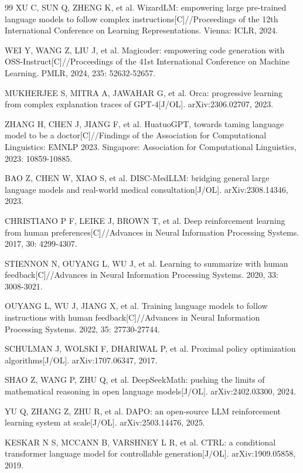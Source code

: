 \documentclass[fontset=fandol,type=master,campus=shenzhen,etitleauto=true]{hithesisbook}
\begin{document}
\begin{thebibliography}{99}
 XU C, SUN Q, ZHENG K, et al. WizardLM: empowering large pre-trained language models to follow complex instructions[C]//Proceedings of the 12th International Conference on Learning Representations. Vienna: ICLR, 2024.

 WEI Y, WANG Z, LIU J, et al. Magicoder: empowering code generation with OSS-Instruct[C]//Proceedings of the 41st International Conference on Machine Learning. PMLR, 2024, 235: 52632-52657.

 MUKHERJEE S, MITRA A, JAWAHAR G, et al. Orca: progressive learning from complex explanation traces of GPT-4[J/OL]. arXiv:2306.02707, 2023.

 ZHANG H, CHEN J, JIANG F, et al. HuatuoGPT, towards taming language model to be a doctor[C]//Findings of the Association for Computational Linguistics: EMNLP 2023. Singapore: Association for Computational Linguistics, 2023: 10859-10885.

 BAO Z, CHEN W, XIAO S, et al. DISC-MedLLM: bridging general large language models and real-world medical consultation[J/OL]. arXiv:2308.14346, 2023.

 CHRISTIANO P F, LEIKE J, BROWN T, et al. Deep reinforcement learning from human preferences[C]//Advances in Neural Information Processing Systems. 2017, 30: 4299-4307.

 STIENNON N, OUYANG L, WU J, et al. Learning to summarize with human feedback[C]//Advances in Neural Information Processing Systems. 2020, 33: 3008-3021.

 OUYANG L, WU J, JIANG X, et al. Training language models to follow instructions with human feedback[C]//Advances in Neural Information Processing Systems. 2022, 35: 27730-27744.

 SCHULMAN J, WOLSKI F, DHARIWAL P, et al. Proximal policy optimization algorithms[J/OL]. arXiv:1707.06347, 2017.

 SHAO Z, WANG P, ZHU Q, et al. DeepSeekMath: pushing the limits of mathematical reasoning in open language models[J/OL]. arXiv:2402.03300, 2024.

 YU Q, ZHANG Z, ZHU R, et al. DAPO: an open-source LLM reinforcement learning system at scale[J/OL]. arXiv:2503.14476, 2025.

 KESKAR N S, MCCANN B, VARSHNEY L R, et al. CTRL: a conditional transformer language model for controllable generation[J/OL]. arXiv:1909.05858, 2019.


\end{thebibliography}
\end{document}
